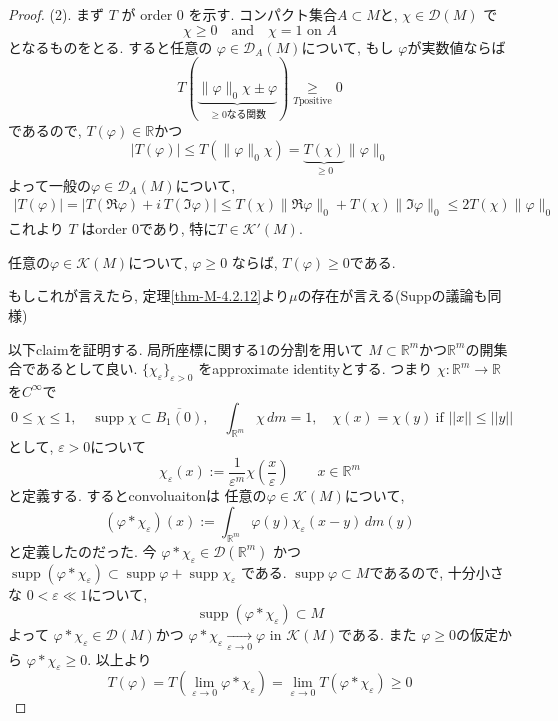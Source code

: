 \begin{proof}
(2). 
まず \(T\) が order \(0\) を示す. 
コンパクト集合\(A \subset M\)と, 
 \(\chi \in \mathcal{D}(M)\) で
$$
\chi \geq 0 \quad \text{and} \quad 
 \chi=1 \text{ on } A
 $$
 となるものをとる. 
すると任意の \(\varphi \in \mathcal{D}_A(M)\)について, 
もし \(\varphi\)が実数値ならば
\[
T(\underbrace{\|\varphi\|_0\chi \pm \varphi}_{\text{$\ge 0$なる関数}})
\underset{T \text{positive} }{\geq} 0
\]
であるので, $T(\varphi)\in \mathbb{R}$かつ
\[
|T(\varphi)|\leq T(\|\varphi\|_0\chi)=\underbrace{T(\chi)}_{\ge 0}\|\varphi\|_0
\]
よって一般の\(\varphi \in \mathcal{D}_A(M)\)について, 
\begin{align*}
|T(\varphi)|
=|T(\Re\varphi)+i\,T(\Im\varphi)|
\leq T(\chi)\|\Re\varphi\|_0+T(\chi)\|\Im\varphi\|_0
\leq 2T(\chi)\|\varphi\|_0
\end{align*}
これより \(T\) はorder \(0\)であり, 特に\(T \in \mathcal{K}'(M)\).


\begin{tcolorbox}[mybox]
\begin{claim}
任意の\(\varphi\in \mathcal{K}(M)\)について,  \(\varphi\geq 0\) ならば, \(T(\varphi)\geq 0\)である. 
\end{claim}
\end{tcolorbox}
もしこれが言えたら, 定理\ref{thm-M-4.2.12}より$\mu$の存在が言える(Suppの議論も同様)

以下claimを証明する. 
局所座標に関する1の分割を用いて \(M \subset \mathbb{R}^{m}\)かつ$ \mathbb{R}^{m}$の開集合であるとして良い. 
 \(\{\chi_{\varepsilon}\}_{\varepsilon>0}\) をapproximate identityとする. 
 つまり
$\chi:\mathbb{R}^{m}\to \mathbb{R}$を$C^{\infty}$で
$$\ 0\leq \chi\leq 1, 
\quad \operatorname{supp}\chi\subset \overline{B_{1}(0)}, 
\quad \int_{\mathbb{R}^{m}} \chi\, dm = 1, 
\quad  \chi(x)=\chi(y)\ \text{if } ||x||\leq ||y||
$$
として, $\varepsilon > 0$について
$$
\chi_{\varepsilon}(x):=\dfrac{1}{\varepsilon^{m}}\chi\left(\dfrac{x}{\varepsilon}\right)\qquad x\in \mathbb{R}^{m}
$$
と定義する. 
するとconvoluaitonは
任意の\(\varphi\in \mathcal{K}(M)\)について, 
\[
(\varphi\ast\chi_{\varepsilon})(x):=\int_{\mathbb{R}^{m}}\varphi(y)\chi_{\varepsilon}(x-y)\,dm(y)
\]
と定義したのだった. 今
\(
\varphi\ast\chi_{\varepsilon}\in \mathcal{D}(\mathbb{R}^{m})
\)
かつ \(
\operatorname{supp}(\varphi\ast\chi_{\varepsilon})\subset \operatorname{supp}\varphi+\operatorname{supp}\chi_{\varepsilon}
\)
である. 
\(\operatorname{supp}\varphi\subset M\)であるので, 十分小さな \(0<\varepsilon\ll 1\)について, 
 \[\operatorname{supp}(\varphi\ast\chi_{\varepsilon})\subset M\]
 よって
\(\varphi\ast\chi_{\varepsilon}\in \mathcal{D}(M)\)かつ
\(\varphi\ast\chi_{\varepsilon}\xrightarrow[\varepsilon\to 0]{}\varphi\text{ in }\mathcal{K}(M)
\)である. 
また \(\varphi\geq 0\)の仮定から \(\varphi\ast\chi_{\varepsilon}\geq 0\).
以上より
\[
T(\varphi)=T(\lim_{\varepsilon\to 0}\varphi\ast\chi_{\varepsilon})
=\lim_{\varepsilon\to 0}T(\varphi\ast\chi_{\varepsilon})\geq 0
\]

\end{proof}

